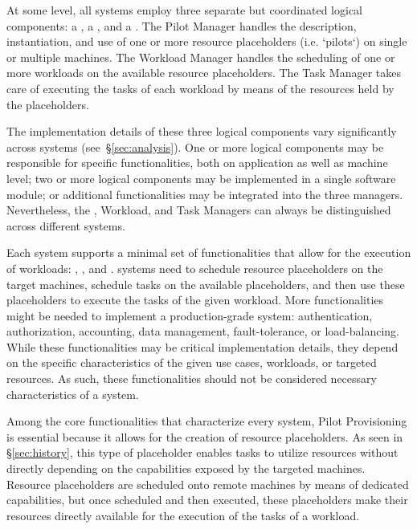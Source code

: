 \documentclass{sig-alternate}
\begin{document}

At some level, all \pilotjob systems employ three separate but coordinated
logical components: a , a , and a
. The Pilot Manager handles the description, instantiation,
and use of one or more resource placeholders (i.e. `pilots`) on single or
multiple machines. The Workload Manager handles the scheduling of one or more
workloads on the available resource placeholders. The Task Manager takes care of
executing the tasks of each workload by means of the resources held by the
placeholders.

The implementation details of these three logical components vary significantly
across \pilotjob systems (see~\S\ref{sec:analysis}). One or more logical
components may be responsible for specific functionalities, both on application
as well as machine level; two or more logical components may be implemented in a
single software module; or additional functionalities may be integrated into the
three managers. Nevertheless, the \pilot, Workload, and Task Managers can always
be distinguished across different \pilotjob systems.

Each \pilotjob system supports a minimal set of functionalities that allow for
the execution of workloads: , , and . \pilotjob systems need to schedule
resource placeholders on the target machines, schedule tasks on the available
placeholders, and then use these placeholders to execute the tasks of the given
workload. More functionalities might be needed to implement a production-grade
\pilotjob system: authentication, authorization, accounting, data management,
fault-tolerance, or load-balancing. While these functionalities may be critical
implementation details, they depend on the specific characteristics of the given
use cases, workloads, or targeted resources. As such, these functionalities
should not be considered necessary characteristics of a \pilotjob
system.  

Among the core functionalities that characterize every \pilotjob system, Pilot
Provisioning is essential because it allows for the creation of resource
placeholders. As seen in \S\ref{sec:history}, this type of placeholder enables
tasks to utilize resources without directly depending on the capabilities
exposed by the targeted machines. Resource placeholders are scheduled onto
remote machines by means of dedicated capabilities, but once scheduled and then
executed, these placeholders make their resources directly available for the
execution of the tasks of a workload.
\end{document}
